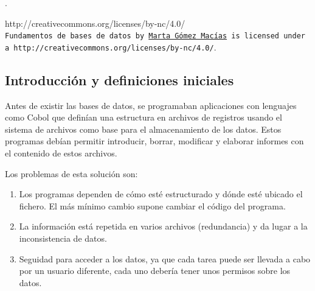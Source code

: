 \documentclass[10pt,a4paper,spanish]{report}
\begin{document}
\restoregeometry %
\nopagecolor%

\thispagestyle{empty}
.\\[175mm]
\begin{center}
{http://creativecommons.org/licenses/by-nc/4.0/}\\
\texttt{Fundamentos de bases de datos by
\href{mailto:mgmacias95@gmail.com}{Marta Gómez Macías}
is licensed under a 
{http://creativecommons.org/licenses/by-nc/4.0/}}.
\end{center}

\tableofcontents

\textcolor[rgb]{1,0.2,0.3}{\chapter{Introducción y definiciones iniciales}}
Antes de existir las bases de datos, se programaban aplicaciones con lenguajes como Cobol que definían una estructura en archivos de registros usando el sistema de archivos como base para el almacenamiento de los datos. Estos programas debían permitir introducir, borrar, modificar y elaborar informes con el contenido de estos archivos.

Los problemas de esta solución son:
\begin{enumerate}[$\heartsuit$]
    \item Los programas dependen de cómo esté estructurado y dónde esté ubicado el fichero. El más mínimo cambio supone cambiar el código del programa.
    \item La información está repetida en varios archivos (redundancia) y da lugar a la inconsistencia de datos.
    \item Seguidad para acceder a los datos, ya que cada tarea puede ser llevada a cabo por un usuario diferente, cada uno debería tener unos permisos sobre los datos.
\end{enumerate}
\end{document}
